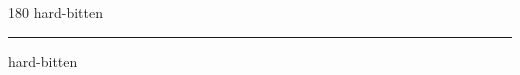 
\begin{frame}
\begin{center}
\begin{turn}{180}
{\fontsize{2.5cm}{1em}\selectfont hard-bitten}
\end{turn}
\vspace{1em}\par  
\hrule
\vspace{1em}\par  
{\fontsize{2.5cm}{1em}\selectfont hard-bitten}
\end{center}
\end{frame}
